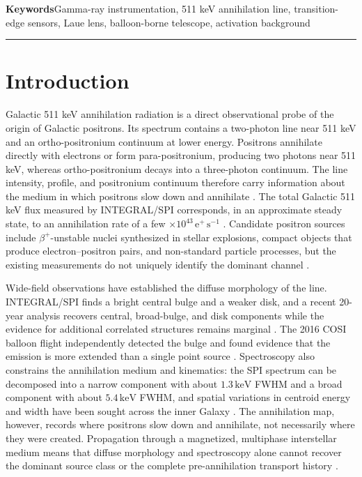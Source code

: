 \documentclass[11pt]{article}
\newcommand{\keV}{\ensuremath{\,\mathrm{keV}}}
\begin{document}
\vspace{0.7em}
\noindent\textbf{Keywords}\hspace{0.7em}Gamma-ray instrumentation, 511 keV annihilation line, transition-edge sensors, Laue lens, balloon-borne telescope, activation background

\vspace{0.3em}
\noindent\rule{\textwidth}{0.4pt}
\vspace{1.0em}

\section{Introduction}
\label{sec:introduction}

Galactic 511 keV annihilation radiation is a direct observational probe of the
origin of Galactic positrons. Its spectrum contains a two-photon line near
511 keV and an ortho-positronium continuum at lower energy. Positrons annihilate
directly with electrons or form para-positronium, producing two photons near
511 keV, whereas ortho-positronium decays into a three-photon continuum. The
line intensity, profile, and positronium continuum therefore carry information
about the medium in which positrons slow down and annihilate
\cite{Prantzos2011,Jean2006}. The total Galactic 511 keV flux measured by
INTEGRAL/SPI corresponds, in an approximate steady state, to an annihilation
rate of a few $\times10^{43}\,\mathrm{e^+\,s^{-1}}$
\cite{Prantzos2011,Kierans2020}. Candidate positron sources include
$\beta^+$-unstable nuclei synthesized in stellar explosions, compact objects
that produce electron--positron pairs, and non-standard particle processes, but
the existing measurements do not uniquely identify the dominant channel
\cite{Prantzos2011,Siegert2016AA,Siegert2016V404}.

Wide-field observations have established the diffuse morphology of the line.
INTEGRAL/SPI finds a bright central bulge and a weaker disk, and a recent
20-year analysis recovers central, broad-bulge, and disk components while the
evidence for additional correlated structures remains marginal
\cite{Knodlseder2005AllSky,Siegert2016AA,Yoneda2025}. The 2016 COSI balloon flight independently
detected the bulge and found evidence that the emission is more extended than a
single point source \cite{Kierans2020,Siegert2020COSI}. Spectroscopy also
constrains the annihilation medium and kinematics: the SPI spectrum can be
decomposed into a narrow component with about $1.3\keV$ FWHM and a broad
component with about $5.4\keV$ FWHM, and spatial variations in centroid energy
and width have been sought across the inner Galaxy
\cite{Jean2006,Siegert2019Kinematics}. The annihilation map, however, records
where positrons slow down and annihilate, not necessarily where they were
created. Propagation through a magnetized, multiphase interstellar medium means
that diffuse morphology and spectroscopy alone cannot recover the dominant
source class or the complete pre-annihilation transport history
\cite{Prantzos2011}.
\end{document}
